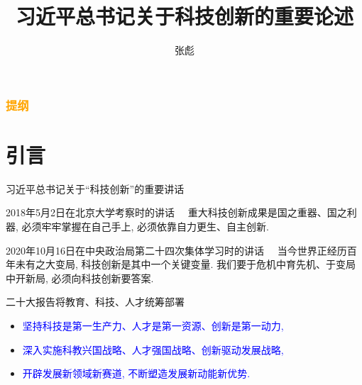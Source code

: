 \documentclass[10pt,punct]{ctexbeamer}
\newcommand{\blue}{\textcolor{blue}}
\begin{document}
\title[]{习近平总书记关于科技创新的重要论述}
\author[]{{\large 张彪} }

\date{}






\begin{frame}
\maketitle
\end{frame}

\begin{frame}
\frametitle{\textcolor{orange}{提纲}}
\tableofcontents
\end{frame}





\section{引言}


\begin{frame}{习近平总书记关于“科技创新”的重要讲话}
\begin{block}{2018年5月2日在北京大学考察时的讲话}
    　重大科技创新成果是国之重器、国之利器, 必须牢牢掌握在自己手上, 必须依靠自力更生、自主创新.
\end{block}

\begin{block}{2020年10月16日在中央政治局第二十四次集体学习时的讲话}
　当今世界正经历百年未有之大变局, 科技创新是其中一个关键变量. 我们要于危机中育先机、于变局中开新局, 必须向科技创新要答案.
\end{block}
\end{frame}

\begin{frame}{二十大报告将教育、科技、人才统筹部署}

\begin{itemize}
\item \blue{坚持科技是第一生产力、人才是第一资源、创新是第一动力, }
\item \blue{深入实施科教兴国战略、人才强国战略、创新驱动发展战略, }
\item \blue{开辟发展新领域新赛道, 不断塑造发展新动能新优势. }
\end{itemize}

\end{frame}
\end{document}
